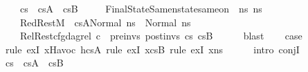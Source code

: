 \begin{isabellebody}
\ \ \ \ {\isachardoublequoteopen}cs{}\ {\isacharequal}{\kern0pt}\ cs{}A\ {\isacharat}{\kern0pt}\ cs{}B{\isachardoublequoteclose}\ \isanewline
\ \ \ \ FinalStateSame{\isacharcolon}{\kern0pt}{\isachardoublequoteopen}nstate{\isacharunderscore}{\kern0pt}same{\isacharunderscore}{\kern0pt}on\ {\isasymLambda}\ ns{}\ ns{}{\isacharprime}{\kern0pt}\ {\isacharbraceleft}{\kern0pt}{\isacharbraceright}{\kern0pt}{\isachardoublequoteclose}\ \isanewline
\ \ \ \ RedRest{\isacharcolon}{\kern0pt}{\isachardoublequoteopen}M{\isacharcomma}{\kern0pt}{\isasymLambda}{\isacharcomma}{\kern0pt}{\isasymGamma}{\isacharcomma}{\kern0pt}{\isasymOmega}\ {\isasymturnstile}\ {\isasymlangle}cs{}A{\isacharcomma}{\kern0pt}Normal\ {\isacharquery}{\kern0pt}ns{}{\isasymrangle}\ {\isacharbrackleft}{\kern0pt}{\isasymrightarrow}{\isacharbrackright}{\kern0pt}\ Normal\ ns{}{\isacharprime}{\kern0pt}{\isachardoublequoteclose}\ \ \isanewline
\ \ \ \ RelRest{\isacharcolon}{\kern0pt}{\isachardoublequoteopen}cfg{\isacharunderscore}{\kern0pt}dag{\isacharunderscore}{\kern0pt}rel\ c\ {\isacharbrackleft}{\kern0pt}{\isacharbrackright}{\kern0pt}\ pre{\isacharunderscore}{\kern0pt}invs\ post{\isacharunderscore}{\kern0pt}invs\ cs{}\ cs{}B{\isachardoublequoteclose}\isanewline
\ \ \ \ \isamarkupfalse%
\ blast\isanewline
\ \ \isamarkupfalse%
\ {\isacharquery}{\kern0pt}case\isanewline
\ \ \ \ \isamarkupfalse%
\ {\isacharparenleft}{\kern0pt}rule\ exI{\isacharbrackleft}{\kern0pt}\ {\isacharquery}{\kern0pt}x{\isacharequal}{\kern0pt}{\isachardoublequoteopen}{\isacharbrackleft}{\kern0pt}Havoc\ h{\isacharbrackright}{\kern0pt}{\isacharat}{\kern0pt}cs{}A{\isachardoublequoteclose}{\isacharbrackright}{\kern0pt}{\isacharcomma}{\kern0pt}\ rule\ exI{\isacharbrackleft}{\kern0pt}\ {\isacharquery}{\kern0pt}x{\isacharequal}{\kern0pt}cs{}B{\isacharbrackright}{\kern0pt}{\isacharcomma}{\kern0pt}\ rule\ exI{\isacharbrackleft}{\kern0pt}\ {\isacharquery}{\kern0pt}x{\isacharequal}{\kern0pt}ns{}{\isacharprime}{\kern0pt}{\isacharbrackright}{\kern0pt}{\isacharparenright}{\kern0pt}\isanewline
\ \ \ \ \isamarkupfalse%
\ {\isacharparenleft}{\kern0pt}intro\ conjI{\isacharparenright}{\kern0pt}\isanewline
\ \ \ \ \isamarkupfalse%
\ {\isacartoucheopen}cs{}\ {\isacharequal}{\kern0pt}\ cs{}A\ {\isacharat}{\kern0pt}\ cs{}B{\isacartoucheclose}\ \isamarkupfalse%

\end{isabellebody}
